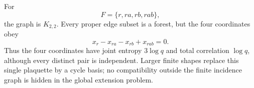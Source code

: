 \begin{example}\label{ex:plaquette}
For
\[
 F=\{r,ra,rb,rab\},
\]
the graph is $K_{2,2}$.  Every proper edge subset is a forest, but the four
coordinates obey
\[
 x_r-x_{ra}-x_{rb}+x_{rab}=0.
\]
Thus the four coordinates have joint entropy $3\log q$ and total correlation
$\log q$, although every distinct pair is independent.  Larger finite shapes
replace this single plaquette by a cycle basis; no compatibility outside the
finite incidence graph is hidden in the global extension problem.
\end{example}
